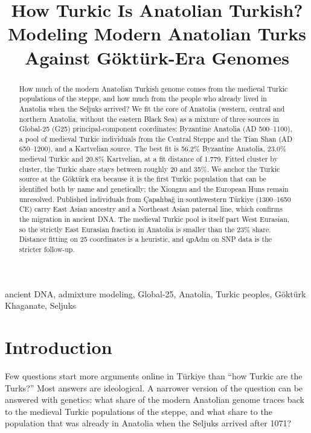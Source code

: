 \documentclass[conference,a4paper]{IEEEtran}
\title{How Turkic Is Anatolian Turkish?\\ Modeling Modern Anatolian Turks Against Göktürk-Era Genomes}
\author{\IEEEauthorblockN{Umay~\c{S}aml\i{}}
\IEEEauthorblockA{\textit{Independent researcher}\\
samliumay965@gmail.com}}
\begin{document}
\maketitle

\begin{abstract}
How much of the modern Anatolian Turkish genome comes from the medieval Turkic populations of the steppe, and how much from the people who already lived in Anatolia when the Seljuks arrived? We fit the core of Anatolia (western, central and northern Anatolia, without the eastern Black Sea) as a mixture of three sources in Global-25 (G25) principal-component coordinates: Byzantine Anatolia (AD 500--1100), a pool of medieval Turkic individuals from the Central Steppe and the Tian Shan (AD 650--1200), and a Kartvelian source. The best fit is 56.2\% Byzantine Anatolia, 23.0\% medieval Turkic and 20.8\% Kartvelian, at a fit distance of 1.779. Fitted cluster by cluster, the Turkic share stays between roughly 20 and 35\%. We anchor the Turkic source at the Göktürk era because it is the first Turkic population that can be identified both by name and genetically; the Xiongnu and the European Huns remain unresolved. Published individuals from Çapalıbağ in southwestern Türkiye (1300--1650 CE) carry East Asian ancestry and a Northeast Asian paternal line, which confirms the migration in ancient DNA. The medieval Turkic pool is itself part West Eurasian, so the strictly East Eurasian fraction in Anatolia is smaller than the 23\% share. Distance fitting on 25 coordinates is a heuristic, and qpAdm on SNP data is the stricter follow-up.
\end{abstract}

\begin{IEEEkeywords}
ancient DNA, admixture modeling, Global-25, Anatolia, Turkic peoples, Göktürk Khaganate, Seljuks
\end{IEEEkeywords}

\section{Introduction}
Few questions start more arguments online in Türkiye than ``how Turkic are the Turks?'' Most answers are ideological. A narrower version of the question can be answered with genetics: what share of the modern Anatolian genome traces back to the medieval Turkic populations of the steppe, and what share to the population that was already in Anatolia when the Seljuks arrived after 1071?
\end{document}
